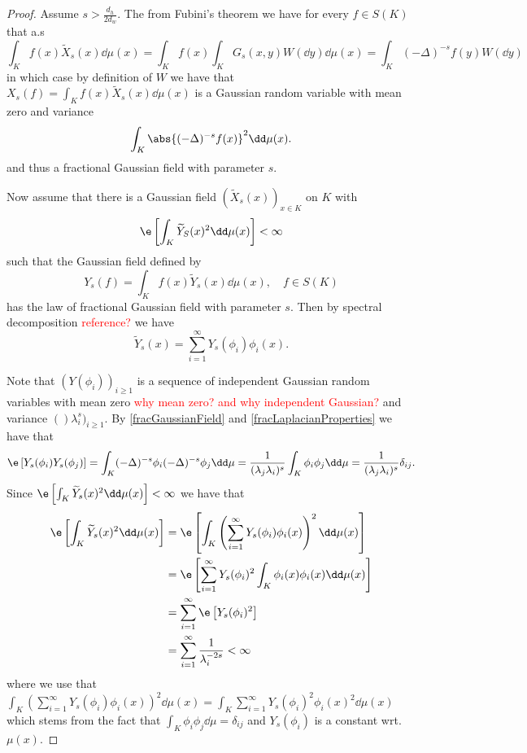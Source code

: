 \begin{proof}
	Assume $s > \frac{d_h}{2d_w}$. The from Fubini's theorem we have for every $f \in S(K)$ that a.s 
	\begin{equation}
		\int_{K}f(x)\widetilde{X}_{s}(x) \dd \mu(x) =\int_{K}f(x) \int_{K} G_s(x,y) W(\dd y) \dd \mu(x) = \int_{K}(-\Delta)^{-s} f(y) W(\dd y)
	\end{equation}
	in which case by definition of $W$ we have that $X_s(f) = \int_{K}f(x)\widetilde{X}_{s}(x) \dd \mu(x)$ is a Gaussian random variable with mean zero and variance
	\begin{equation}
		\int_{K}\abs{(-\Delta)^{-s}f(x)}^{2}\dd \mu(x).
	\end{equation}
	and thus a fractional Gaussian field with parameter $s$. 
	
	Now assume that there is a Gaussian field $\left(\widetilde{X}_{s}(x)\right)_{x \in K}$ on $K$ with
	\begin{equation}
		\e \left[\int_{K}\widetilde{Y}_S(x)^2 \dd \mu(x)\right] < \infty
	\end{equation}
	such that the Gaussian field defined by
	\begin{equation}
		Y_s(f) = \int_{K}f(x) \widetilde{Y}_{s}(x) \dd \mu (x), \quad f \in S(K)
	\end{equation}
	has the law of fractional Gaussian field with parameter $s$. Then by spectral decomposition \textcolor{red}{reference?} we have
	\begin{equation}
		\widetilde{Y}_s(x) = \sum_{i = 1}^{\infty} Y_s(\phi_i)\phi_i(x).
	\end{equation}
	
	Note that $(Y(\phi_i))_{i \geq 1}$ is a sequence of independent Gaussian random variables with mean zero \textcolor{red}{why mean zero? and why independent Gaussian?} and variance $()\lambda_{i}^{s})_{i \geq 1}$. By \cref{fracGaussianField} and \cref{fracLaplacianProperties} we have that
	\begin{equation}
		\e \left[Y_s(\phi_i)Y_s(\phi_j)\right] = \int_{K}  (-\Delta)^{-s}\phi_i (-\Delta)^{-s}\phi_j \dd \mu = \frac{1}{(\lambda_{j}\lambda_i)^{s}} \int_{K} \phi_i \phi_j \dd \mu = \frac{1}{(\lambda_{j}\lambda_i)^{s}} \delta_{ij}.
	\end{equation}
	Since $\e \left[\int_{K} \widetilde{Y}_{s}(x)^2 \dd \mu (x)\right] < \infty$  we have that
	\begin{align}
		\e \left[\int_{K} \widetilde{Y}_{s}(x)^2 \dd \mu (x)\right]  &= \e \left[\int_{K} \left(\sum_{i = 1}^{\infty} Y_s(\phi_i)\phi_i(x)\right)^{2}\dd\mu(x)\right] \\
		& = \e \left[\sum_{i = 1}^{\infty} Y_s(\phi_i)^2\int_{K} \phi_i(x)\phi_i(x) \dd \mu (x) \right] \\
		& = \sum_{i = 1}^{\infty}\e \left[Y_s(\phi_i)^2\right] \\
		& = \sum_{i = 1}^{\infty} \frac{1}{\lambda_i^{-2s}} < \infty
	\end{align}
	where we use that $\int_{K} (\sum_{i = 1}^{\infty} Y_s(\phi_i)\phi_i(x))^2 \dd \mu(x) = \int_{K} \sum_{i = 1}^{\infty} Y_s(\phi_i)^2 \phi_i(x)^2 \dd \mu (x)$ which stems from the fact that $\int_{K}\phi_i \phi_j \dd \mu = \delta_{ij}$ and $Y_s(\phi_i)$ is a constant wrt. $\mu(x)$.
	

\end{proof}
